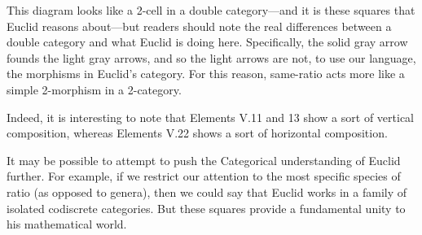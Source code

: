 \documentclass[11pt]{article}
\newcommand{\flushleftright}{\noindent\justifying}
\begin{document}
\centering
{}

\flushleftright%

This diagram looks like a 2-cell in a double category---and it is these squares that Euclid reasons about---but readers should note the real differences between a double category and what Euclid is doing here. Specifically, the solid gray arrow founds the light gray arrows, and so the light arrows are not, to use our language, the morphisms in Euclid's category. For this reason, same-ratio acts more like a simple 2-morphism in a 2-category.

Indeed, it is interesting to note that Elements V.11 and 13 show a sort of vertical composition, whereas Elements V.22 shows a sort of horizontal composition.


It may be possible to attempt to push the Categorical understanding of Euclid further. For example, if we restrict our attention to the most specific species of ratio (as opposed to genera), then we could say that Euclid works in a family of isolated codiscrete categories. But these squares provide a fundamental unity to his mathematical world. 
\end{document}
